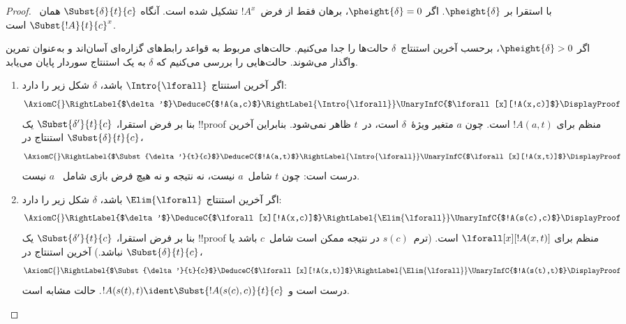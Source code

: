 \documentclass[../../../include/open-logic-section]{subfiles}
\begin{document}
\begin{proof}
با استقرا بر $\pheight{\delta}$. اگر $\pheight{\delta}=0$، برهان فقط
از فرض~$!A^x$ تشکیل شده است. آنگاه
$\Subst{\delta}{t}{c}$ همان~$\Subst{!A}{t}{c}^x$ است.

اگر $\pheight{\delta}>0$، برحسب آخرین استنتاج~$\delta$ حالت‌ها را جدا
می‌کنیم. حالت‌های مربوط به قواعد رابط‌های گزاره‌ای آسان‌اند و به‌عنوان
تمرین واگذار می‌شوند. حالت‌هایی را بررسی می‌کنیم که $\delta$ به یک
استنتاج سوردار پایان می‌یابد.
  \begin{enumerate}
    \item اگر آخرین استنتاج $\Intro{\lforall}$ باشد، $\delta$ شکل زیر
    را دارد:
    \[
    \AxiomC{}
    \RightLabel{$\delta'$}
    \DeduceC{$!A(a,c)$}
    \RightLabel{\Intro{\lforall}}
    \UnaryInfC{$\lforall[x][!A(x,c)]$}
    \DisplayProof
    \]
    بنا بر فرض استقرا، $\Subst{\delta'}{t}{c}$ یک !!{proof} منظم برای
    $!A(a,t)$ است. چون $a$ متغیر ویژهٔ~$\delta$ است، در~$t$ ظاهر
    نمی‌شود. بنابراین آخرین استنتاج در $\Subst{\delta}{t}{c}$،
    \[
    \AxiomC{}
    \RightLabel{$\Subst{\delta'}{t}{c}$}
    \DeduceC{$!A(a,t)$}
    \RightLabel{\Intro{\lforall}}
    \UnaryInfC{$\lforall[x][!A(x,t)]$}
    \DisplayProof
    \]
    درست است: چون $t$ شامل~$a$ نیست، نه نتیجه و نه هیچ فرض بازی شامل
    ~‌$a$ نیست.

    \item اگر آخرین استنتاج $\Elim{\lforall}$ باشد، $\delta$ شکل زیر
    را دارد:
    \[
    \AxiomC{}
    \RightLabel{$\delta'$}
    \DeduceC{$\lforall[x][!A(x,c)]$}
    \RightLabel{\Elim{\lforall}}
    \UnaryInfC{$!A(s(c),c)$}
    \DisplayProof
    \]
    بنا بر فرض استقرا، $\Subst{\delta'}{t}{c}$ یک !!{proof} منظم برای
    $\lforall[x][!A(x,t)]$ است. (ترم~$s(c)$ در نتیجه ممکن است شامل~$c$
    باشد یا نباشد.) آخرین استنتاج در $\Subst{\delta}{t}{c}$،
    \[
    \AxiomC{}
    \RightLabel{$\Subst{\delta'}{t}{c}$}
    \DeduceC{$\lforall[x][!A(x,t)]$}
    \RightLabel{\Elim{\lforall}}
    \UnaryInfC{$!A(s(t),t)$}
    \DisplayProof
    \]
    درست است و
    $!A(s(t),t)\ident\Subst{!A(s(c),c)}{t}{c}$.
    حالت \Intro{\lexists} مشابه است.


\end{enumerate}
\end{proof}
\end{document}
